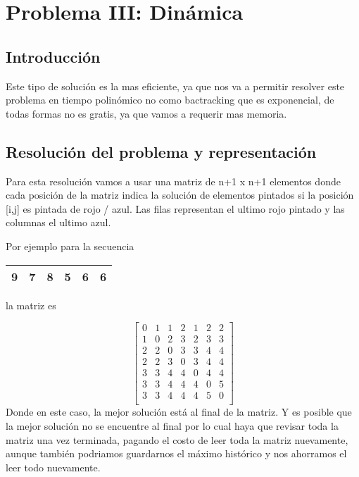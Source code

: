 \section{Problema III: Dinámica}

\subsection{Introducción}

Este tipo de solución es la mas eficiente,  ya que nos va a permitir resolver este problema en tiempo polinómico
no como bactracking que es exponencial, de todas formas no es gratis, ya que vamos a requerir mas memoria.

\subsection{Resolución del problema y representación}

Para esta resolución  vamos a usar una matriz de n+1 x n+1 elementos donde cada posición de la matriz
indica la solución  de elementos pintados si la posición [i,j] es pintada de rojo / azul. Las filas
representan el ultimo rojo pintado y las columnas el ultimo azul.

Por ejemplo para la secuencia
\begin{tabular}{ | l | c | r | l | c | r |}
  \hline
9 & 7 & 8 & 5 & 6 & 6 \\ \hline
\end{tabular}
la matriz es

\[
  \begin{bmatrix}
    0 & 1 & 1 & 2 & 1 & 2 & 2 \\
    1 & 0 & 2 & 3 & 2 & 3 & 3 \\
    2 & 2 & 0 & 3 & 3 & 4 & 4 \\
    2 & 2 & 3 & 0 & 3 & 4 & 4 \\
    3 & 3 & 4 & 4 & 0 & 4 & 4 \\
    3 & 3 & 4 & 4 & 4 & 0 & 5 \\
    3 & 3 & 4 & 4 & 4 & 5 & 0 \\
  \end{bmatrix}
\]
Donde en este caso, la mejor solución está al final de la matriz.  Y es posible que la mejor solución no se
encuentre al final por lo cual haya que revisar toda la matriz una vez terminada, pagando el costo de leer toda
la matriz nuevamente, aunque también podriamos guardarnos el máximo histórico y nos ahorramos el leer todo nuevamente.

